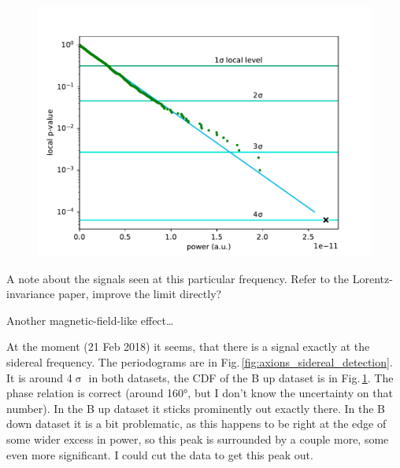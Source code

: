 \begin{figure}
  \centering
  \includegraphics[width=0.8\linewidth]{gfx/axions/winddeltah4mm_sidereal_detection.pdf}
  \caption{\cite{Romalis2009_NF}}\label{fig:axions_sidereal_cdf}
\end{figure}

A note about the signals seen at this particular frequency. Refer to the Lorentz-invariance paper, improve the limit directly?~\cite{ALTAREV20112365}

Another magnetic-field-like effect\ldots

At the moment (21 Feb 2018) it seems, that there is a signal exactly at the sidereal frequency. The periodograms are in Fig.\,\ref{fig:axions_sidereal_detection}. It is around 4$\upsigma$ in both datasets, the CDF of the B up dataset is in Fig.\,\ref{fig:axions_sidereal_cdf}. The phase relation is correct (around \ang{160}, but I don't know the uncertainty on that number). In the B up dataset it sticks prominently out exactly there. In the B down dataset it is a bit problematic, as this happens to be right at the edge of some wider excess in power, so this peak is surrounded by a couple more, some even more significant. I could cut the data to get this peak out. 